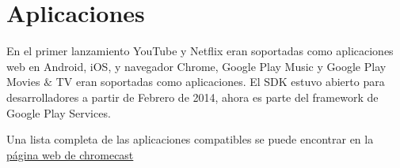 \section{Aplicaciones}
En el primer lanzamiento YouTube y Netflix eran soportadas como aplicaciones web en Android, iOS, y navegador Chrome, Google Play Music y Google Play Movies $\&$ TV eran soportadas como aplicaciones.
El SDK estuvo abierto para desarrolladores a partir de Febrero de 2014, ahora es parte del framework de Google Play Services.

Una lista completa de las aplicaciones compatibles se puede encontrar en la 
\href{https://www.google.com/intl/en/chromecast/apps/}{página web de chromecast}
